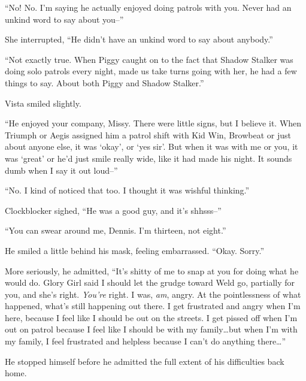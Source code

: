 ``No!  No.  I'm saying he actually enjoyed doing patrols with you.  Never had an unkind word to say about you--''



She interrupted, ``He didn't have an unkind word to say about anybody.''



``Not exactly true.  When Piggy caught on to the fact that Shadow Stalker was doing solo patrols every night, made us take turns going with her, he had a few things to say.  About both Piggy and Shadow Stalker.''



Vista smiled slightly.



``He enjoyed your company, Missy.  There were little signs, but I believe it.  When Triumph or Aegis assigned him a patrol shift with Kid Win, Browbeat or just about anyone else, it was `okay', or `yes sir'.  But when it was with me or you, it was `great' or he'd just smile really wide, like it had made his night.  It sounds dumb when I say it out loud--''



``No. I kind of noticed that too.  I thought it was wishful thinking.''



Clockblocker sighed, ``He was a good guy, and it's shhsss\ldotsucky--''



``You can swear around me, Dennis.  I'm thirteen, not eight.''



He smiled a little behind his mask, feeling embarrassed.  ``Okay.  Sorry.''



More seriously, he admitted, ``It's shitty of me to snap at you for doing what he would do.  Glory Girl said I should let the grudge toward Weld go, partially for you, and she's right.  \emph{You're} right.  I was, \emph{am}, angry.  At the pointlessness of what happened, what's still happening out there.  I get frustrated and angry when I'm here, because I feel like I should be out on the streets.  I get pissed off when I'm out on patrol because I feel like I should be with my family\ldots but when I'm with my family, I feel frustrated and helpless because I can't do anything there\ldots''



He stopped himself before he admitted the full extent of his difficulties back home.



